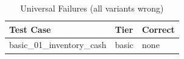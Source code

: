 \begin{table}[htbp]
\centering
\caption{Universal Failures (all variants wrong)}
\label{tab:all-fail}
\begin{tabular}{l l l}
\toprule
Test Case & Tier & Correct \\
\midrule
  basic\_01\_inventory\_cash & basic & none \\
\bottomrule
\end{tabular}
\end{table}

